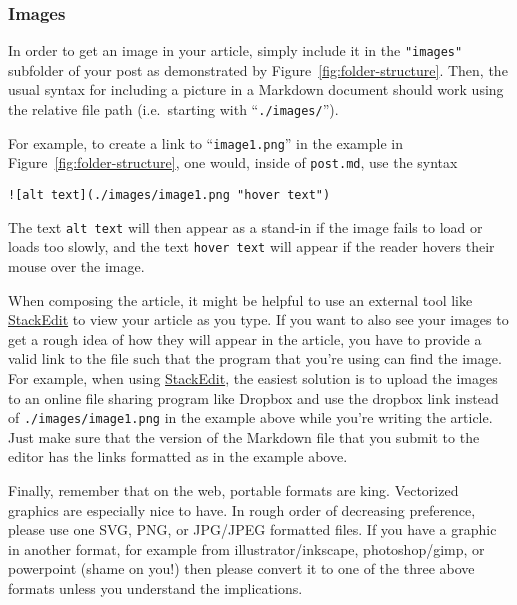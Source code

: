 \documentclass[paper=a4, fontsize=11pt]{scrartcl}
\numberwithin{equation}{section}        %
\numberwithin{figure}{section}            %
\numberwithin{table}{section}                %
\begin{document}
\subsubsection{Images}\label{sec:image-links}
In order to get an image in your article, simply include it in the
\texttt{"images"} subfolder of your post as demonstrated by
Figure~\ref{fig:folder-structure}. Then, the usual syntax for including a
picture in a Markdown document should work using the relative file path
(i.e.\ starting with ``\texttt{./images/}'').

For example, to create a link to ``\texttt{image1.png}'' in the example in
Figure~\ref{fig:folder-structure}, one would, inside of \texttt{post.md}, use
the syntax

\begin{verbatim}![alt text](./images/image1.png "hover text")\end{verbatim}

The text \texttt{alt text} will then appear as a stand-in if the image fails to
load or loads too slowly, and the text \texttt{hover text} will appear if the
reader hovers their mouse over the image.

When composing the article, it might be helpful to use an external tool like
\href{https://stackedit.io/editor}{StackEdit} to view your article as you type.
If you want to also see your images to get a rough idea of how they will appear
in the article, you have to provide a valid link to the file such that the
program that you're using can find the image. For example, when using
\href{https://stackedit.io/editor}{StackEdit}, the easiest solution is to upload
the images to an online file sharing program like Dropbox and use the dropbox
link instead of \texttt{./images/image1.png} in the example above while you're
writing the article. Just make sure that the version of the Markdown file that you
submit to the editor has the links formatted as in the example above.

Finally, remember that on the web, portable formats are king. Vectorized graphics are
especially nice to have. In rough order of decreasing preference, please use one
SVG, PNG, or JPG/JPEG formatted files. If you have a graphic in another format,
for example from illustrator/inkscape, photoshop/gimp, or powerpoint (shame on
you!) then please convert it to one of the three above formats unless you
understand the implications.


\end{document}
